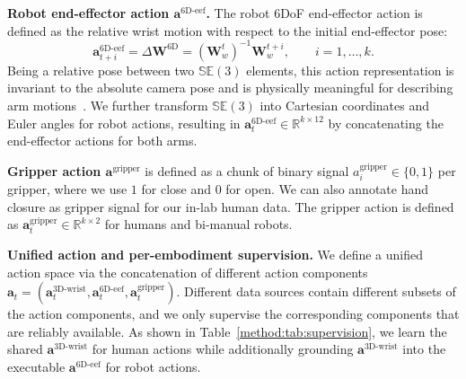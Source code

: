 \documentclass{llmxive}
\providecommand{\myparagraph}[1]{\vspace{0.1em}\noindent\textbf{#1}}
\begin{document}
\myparagraph{Robot end-effector action $\mathbf{a}^{\text{6D-eef}}$.}
% 
The robot 6DoF end-effector action is defined as the relative wrist motion with respect to the initial end-effector pose: 
%
\begin{equation}
\boldsymbol{a}^{\text{6D-eef}}_{t+i}
= \Delta \mathbf{W}^{\text{6D}} =  \left( \mathbf{W}^{t}_{w} \right)^{-1} \mathbf{W}^{t+i}_{w},
\qquad i = 1, \dots, k.
\end{equation}
%
Being a relative pose between two $\mathbb{SE}(3)$ elements, this action representation is invariant to the absolute camera pose and is physically meaningful for describing arm motions~\cite{zheng2026egoscale}.
% 
We further transform $\mathbb{SE}(3)$ into Cartesian coordinates and Euler angles for robot actions, resulting in $\mathbf{a}_{t}^{\text{6D-eef}}\!\in\!\mathbb{R}^{k\times 12}$ by concatenating the end-effector actions for both arms.




\myparagraph{Gripper action $\mathbf{a}^{\text{gripper}}$}
%
is defined as a chunk of binary signal $a^{\text{gripper}}_i \in \{0, 1\}$ per gripper, where we use $1$ for close and $0$ for open.
% 
We can also annotate hand closure as gripper signal for our in-lab human data.
% 
The gripper action is defined as $\mathbf{a}^{\text{gripper}}_t\!\in \!\mathbb{R}^{k\times 2}$ for humans and bi-manual robots.




\myparagraph{Unified action and per-embodiment supervision.}
%
We define a unified action space via the concatenation of different action components 
$\mathbf{a}_t = (\mathbf{a}^{\text{3D-wrist}}_t, \mathbf{a}^{\text{6D-eef}}_t, \mathbf{a}^{\text{gripper}}_t)$. 
% 
Different data sources contain different subsets of the action components, and we only supervise the corresponding components that are reliably available.
% 
As shown in Table~\ref{method:tab:supervision}, we learn the shared $\mathbf{a}^{\text{3D-wrist}}$ for human actions while additionally grounding $\mathbf{a}^{\text{3D-wrist}}$ into the executable $\mathbf{a}^{\text{6D-eef}}$ for robot actions.
\end{document}
